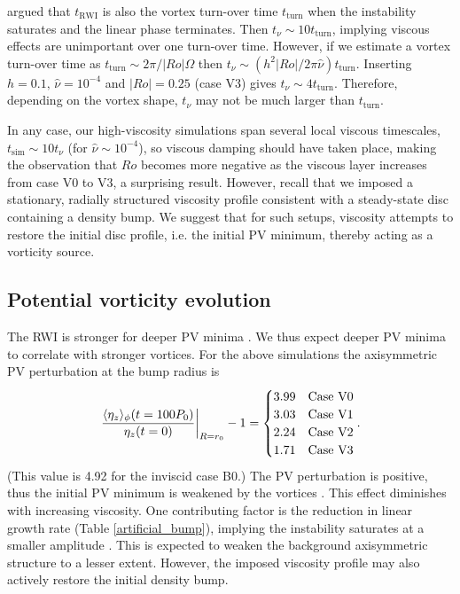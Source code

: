 \cite{meheut13} argued that $t_\mathrm{RWI}$ is also the vortex
turn-over time $t_\mathrm{turn}$ when the instability saturates and
the linear phase terminates. Then 
$t_\nu\sim 10 t_\mathrm{turn}$, implying viscous effects 
are unimportant over one turn-over time. 
However, if we estimate a vortex turn-over time as $t_\mathrm{turn}
\sim 2\pi/|Ro|\Omega$ then $t_\nu\sim (h^2|Ro|/2\pi\hat{\nu})t_\mathrm{turn}$.  
Inserting $h=0.1,\,\hat{\nu}=10^{-4}$ and $|Ro|=0.25$ (case V3) gives 
$t_\nu \sim 4t_\mathrm{turn}$. Therefore, depending on the vortex shape, 
$t_\nu$ may not be much larger than $t_\mathrm{turn}$. 

In any case, our high-viscosity simulations span several local viscous timescales, 
$t_\mathrm{sim}\sim 10t_\nu $ (for $\hat{\nu}\sim10^{-4}$), so viscous
damping should have taken 
place, making the observation that $Ro$ becomes more negative as the 
viscous layer increases from case V0 to V3, a surprising
result. However, recall that we imposed a stationary, radially
structured viscosity profile consistent with a steady-state disc
containing a density bump. We suggest that for such setups, viscosity
attempts to restore the initial disc profile, i.e. the initial PV
minimum, thereby acting as a vorticity source.      

\subsection{Potential vorticity evolution}
The RWI is stronger for deeper PV minima \citep{li00}. We 
thus expect deeper PV minima to correlate with stronger vortices.   
For the above simulations the axisymmetric PV perturbation at the bump
radius is   
\begin{align}\label{vortensity_pert}
  \left.\frac{\langle \eta_z \rangle_\phi(t=100P_0)}{\eta_z(t=0)}\right|_{R=r_0} - 1 = 
  \begin{cases}
    3.99  & \text{Case V0} \\
   3.03  & \text{Case V1} \\
   2.24  & \text{Case V2} \\
   1.71  & \text{Case V3} \\
  \end{cases}.
\end{align} 
(This value is 4.92 for the inviscid case B0.) The PV 
perturbation is positive, thus the initial PV minimum is weakened
by the vortices \citep{meheut10}. This effect
diminishes with increasing viscosity. One contributing factor 
is the reduction in linear growth rate (Table 
\ref{artificial_bump}), implying the  
instability saturates at a smaller amplitude \citep{meheut13}. This  
is expected to weaken the background axisymmetric structure to a lesser
extent. However, the imposed viscosity profile may also actively
restore the initial density bump.     

